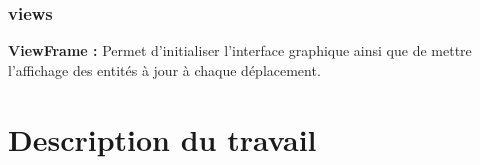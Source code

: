 \documentclass[a4paper]{article}
\begin{document}
\subsubsection{views}
\textbf{ViewFrame :} Permet d'initialiser l'interface graphique ainsi que de
mettre l'affichage des entités à jour à chaque déplacement.


\section*{} %
\section{Description du travail}
\end{document}
